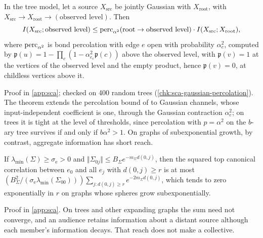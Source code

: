 \begin{theorem}\label{thm:sca-gaussian-percolation}
In the tree model, let a source $X_{\mathrm{src}}$ be jointly Gaussian with $X_{\mathrm{root}}$, with $X_{\mathrm{src}}\to X_{\mathrm{root}}\to(\text{observed level})$. Then
\begin{equation}\label{eq:sca-gauss-perc}
I(X_{\mathrm{src}};\text{observed level})\le\operatorname{perc}_{\alpha^2}(\mathrm{root}\to\text{observed level})\cdot I(X_{\mathrm{src}};X_{\mathrm{root}}),
\end{equation}
where $\operatorname{perc}_{\alpha^2}$ is bond percolation with edge $e$ open with probability $\alpha_e^2$, computed by $\mathfrak p(u)=1-\prod_c(1-\alpha_{e_c}^2\mathfrak p(c))$ above the observed level, with $\mathfrak p(v)=1$ at the vertices of the observed level and the empty product, hence $\mathfrak p(v)=0$, at childless vertices above it.
\end{theorem}
Proof in \cref{app:sca}; checked on 400 random trees (\cref{chk:sca-gaussian-percolation}). The theorem extends the percolation bound of \citet{polyanskiy2017strong} to Gaussian channels, whose input-independent coefficient is one, through the Gaussian contraction $\alpha_e^2$; on trees it is tight at the level of thresholds, since percolation with $p=\alpha^2$ on the $b$-ary tree survives if and only if $b\alpha^2>1$. On graphs of subexponential growth, by contrast, aggregate information has short reach.

\begin{proposition}\label{prop:sca-aggregate}
If $\lambda_{\min}(\Sigma)\ge\sigma_{\mathrm e}>0$ and $\Vert\Sigma_{0j}\Vert\le B_\Sigma e^{-m_\Sigma d(0,j)}$, then the squared top canonical correlation between $e_0$ and all $e_j$ with $d(0,j)\ge r$ is at most $(B_\Sigma^2/(\sigma_{\mathrm{e}}\lambda_{\min}(\Sigma_{00})))\sum_{j:d(0,j)\ge r}e^{-2m_\Sigma d(0,j)}$, which tends to zero exponentially in $r$ on graphs whose spheres grow subexponentially.
\end{proposition}
Proof in \cref{app:sca}. On trees and other expanding graphs the sum need not converge, and an audience retains information about a distant source although each member's information decays. That reach does not make a collective.

